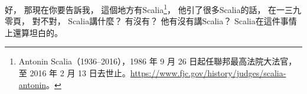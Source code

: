 \hypertarget{w06:cue:2747}{}好，
\hypertarget{w06:cue:2748}{}那現在你要告訴我，
\hypertarget{w06:cue:2749}{}這個地方有Scalia\footnote{Antonin Scalia（1936–2016），1986 年 9 月 26 日起任聯邦最高法院大法官，至 2016 年 2 月 13 日去世止。\url{https://www.fjc.gov/history/judges/scalia-antonin}。}，
\hypertarget{w06:cue:2750}{}他引了很多Scalia的話，
\hypertarget{w06:cue:2751}{}在一三九零頁，
\hypertarget{w06:cue:2752}{}對不對，
\hypertarget{w06:cue:2753}{}Scalia講什麼？
\hypertarget{w06:cue:2754}{}有沒有？
\hypertarget{w06:cue:2755}{}他有沒有講Scalia？
\hypertarget{w06:cue:2756}{}Scalia在這件事情上還算坦白的。


